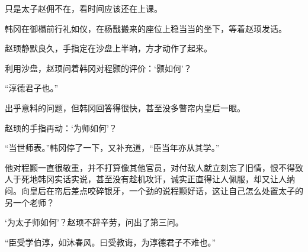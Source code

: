 只是太子赵佣不在，看时间应该还在上课。

韩冈在御榻前行礼如仪，在杨戬搬来的座位上稳当当的坐下，等着赵顼发话。

赵顼静默良久，手指定在沙盘上半晌，方才动作了起来。

利用沙盘，赵顼问着韩冈对程颢的评价：‘颢如何’？

“淳德君子也。”

出乎意料的问题，但韩冈回答得很快，甚至没多瞥帘内皇后一眼。

赵顼的手指再动：‘为师如何’？

“当世师表。”韩冈停了一下，又补充道，“臣当年亦从其学。”

他对程颢一直很敬重，并不打算像其他官员，对付敌人就立刻忘了旧情，恨不得致人于死地韩冈实话实说，甚至没有趁机攻讦，诚实正直得让人佩服，却又让人纳闷。向皇后在帘后差点咬碎银牙，一个劲的说程颢好话，这让自己怎么处置太子的另一个老师？

‘为太子师如何’？赵顼不辞辛劳，问出了第三问。

“臣受学伯淳，如沐春风。曰受教诲，为淳德君子不难也。”

